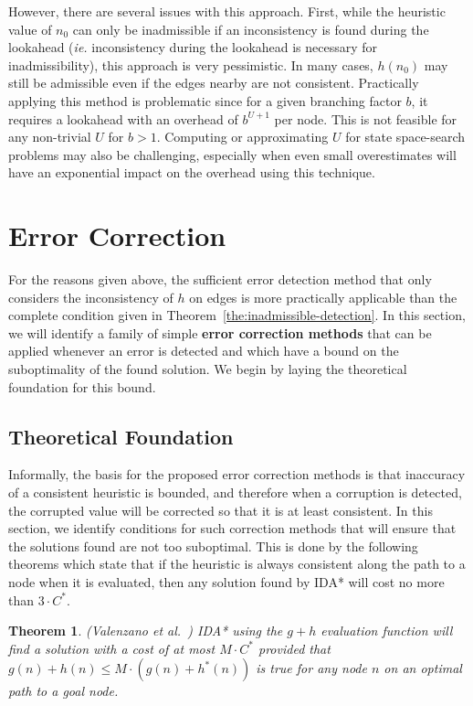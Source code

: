 \documentclass[letterpaper]{article}
\newtheorem{theorem}{Theorem}
\begin{document}
However, there are several issues with this approach. First, while the heuristic value of $n_0$ can only be inadmissible if an inconsistency is found during the lookahead (\textit{ie.} inconsistency during the lookahead is necessary for inadmissibility), this approach is very pessimistic. In many cases, $h(n_0)$ may still be admissible even if the edges nearby are not consistent. Practically applying this method is problematic since for a given branching factor $b$, it requires a lookahead with an overhead of $b^{U+1}$ per node. This is not feasible for any non-trivial $U$ for $b>1$. Computing or approximating $U$ for state space-search problems may also be challenging, especially when even small overestimates will have an exponential impact on the overhead using this technique.



\section{Error Correction}
For the reasons given above, the sufficient error detection method that only considers the inconsistency of $h$ on edges is more practically applicable than the complete condition given in Theorem~\ref{the:inadmissible-detection}.
In this section, we will identify a family of simple \textbf{error correction methods} that can be applied whenever an error is detected and which have a bound on the suboptimality of the found solution.
We begin by laying the theoretical foundation for this bound.





\subsection{Theoretical Foundation}
Informally, the basis for the proposed error correction methods is that inaccuracy of a consistent heuristic is bounded, and therefore when a corruption is detected,
the corrupted value will be corrected so that it is at least consistent.
In this section, we identify conditions for such correction methods that will ensure that the solutions found are not too suboptimal.
This is done by the following theorems which state that if the heuristic is always consistent along the path to a node when it is evaluated, then any solution found by IDA* will cost no more than $3 \cdot C^*$.


\begin{theorem} (Valenzano et al.~)
IDA* using the $g+h$ evaluation function will find a solution with a cost of at most $M\cdot C^*$ provided that $g(n) + h(n) \leq M \cdot (g(n)+h^*(n))$ is true for any node $n$ on an optimal path to a goal node. %
\label{theorem:rickmas}
\end{theorem}
\end{document}
